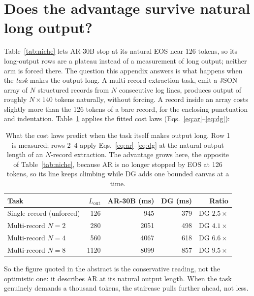 \section{Does the advantage survive natural long output?}
\label{app:forced}

Table~\ref{tab:niche} lets AR-30B stop at its natural EOS near 126
tokens, so its long-output rows are a plateau instead of a
measurement of long output; neither arm is forced there. The question
this appendix answers is what happens when the \emph{task} makes the
output long. A multi-record extraction task, emit a JSON array of
$N$ structured records from $N$ consecutive log lines, produces
output of roughly $N \times 140$ tokens naturally, without forcing.
A record inside an array costs slightly more than the 126 tokens of a
bare record, for the enclosing punctuation and indentation.
Table~\ref{tab:forced} applies the fitted cost laws
(Eqs.~\ref{eq:ar}--\ref{eq:dg}):

\begin{table}[ht!]
\centering
\caption{What the cost laws predict when the task itself makes output
long. Row 1 is measured; rows 2--4 apply Eqs.~\ref{eq:ar}--\ref{eq:dg}
at the natural output length of an $N$-record extraction. The
advantage grows here, the opposite of
Table~\ref{tab:niche}, because AR is no longer stopped by EOS at
126 tokens, so its line keeps climbing while DG adds one bounded
canvas at a time.}
\label{tab:forced}
\begin{tabular}{@{}lrrrr@{}}
\toprule
Task & $L_{\mathrm{out}}$ & AR-30B (ms) & DG (ms) & Ratio \\
\midrule
Single record (unforced) & 126 & 945 & 379 & DG $2.5\times$ \\
Multi-record $N{=}2$ & 280 & 2051 & 498 & DG $4.1\times$ \\
Multi-record $N{=}4$ & 560 & 4067 & 618 & DG $6.6\times$ \\
Multi-record $N{=}8$ & 1120 & 8099 & 857 & DG $9.5\times$ \\
\bottomrule
\end{tabular}
\end{table}

So the figure quoted in the abstract is the conservative
reading, not the optimistic one: it describes AR at its natural output
length. When the task genuinely demands a thousand tokens, the
staircase pulls further ahead, not less.
